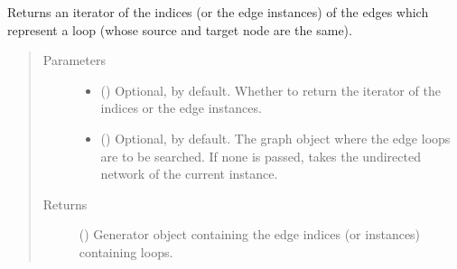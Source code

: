 \documentclass[letterpaper,10pt,english]{sphinxmanual}
\begin{document}
\begin{fulllineitems}
\begin{fulllineitems}
\begin{quote}
\begin{description}
\begin{itemize}
\end{itemize}


\end{description}\end{quote}

\end{fulllineitems}


\begin{fulllineitems}
\label{\detokenize{reference:pypath.main.PyPath.loop_edges}}
Returns an iterator of the indices (or the edge instances) of
the edges which represent a loop (whose source and target node
are the same).
\begin{quote}\begin{description}
\item[{Parameters}] \leavevmode\begin{itemize}
\item {} 
 () \textendash{} Optional,  by default. Whether to return the
iterator of the indices or the edge instances.

\item {} 
 () \textendash{} Optional,  by default. The graph object where the
edge loops are to be searched. If none is passed, takes the
undirected network of the current instance.

\end{itemize}

\item[{Returns}] \leavevmode
() \textendash{} Generator object containing the edge
indices (or instances) containing loops.

\end{description}\end{quote}

\end{fulllineitems}



\end{fulllineitems}
\end{document}
